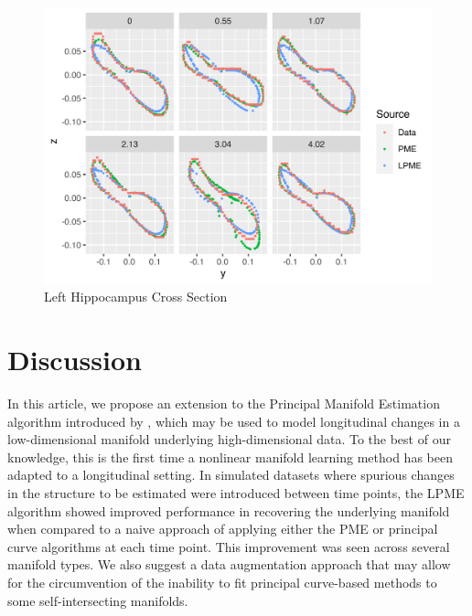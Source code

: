 \documentclass[11pt,reqno]{article}
\renewcommand{\textwidth}{180mm}
\theoremstyle{definition}
\begin{document}
\begin{figure}[h]
  \centering
  \includegraphics[width=\textwidth]{adni_plots/adni_cross_section}
  \caption{Left Hippocampus Cross Section}
  \label{fig:adni_cross_section}
\end{figure}

\section{Discussion}\label{s:discussion}

In this article, we propose an extension to the Principal Manifold Estimation algorithm introduced by \cite{mengPrincipalManifoldEstimation2021}, which may be used to model longitudinal changes in a low-dimensional manifold underlying high-dimensional data. To the best of our knowledge, this is the first time a nonlinear manifold learning method has been adapted to a longitudinal setting. In simulated datasets where spurious changes in the structure to be estimated were introduced between time points, the LPME algorithm showed improved performance in recovering the underlying manifold when compared to a naive approach of applying either the PME or principal curve algorithms at each time point. This improvement was seen across several manifold types. We also suggest a data augmentation approach that may allow for the circumvention of the inability to fit principal curve-based methods to some self-intersecting manifolds. 
\end{document}
